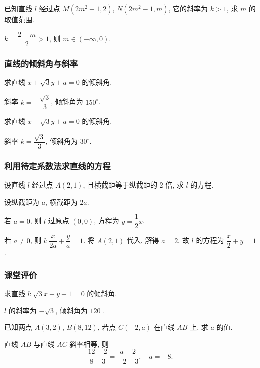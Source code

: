 \lianxi
\begin{exercise}[s]
    已知直线 $l$ 经过点 $M(2m^2 +1, 2)$, $N(2m^2 -1, m)$, 它的斜率为 $k> 1$, 求 $m$ 的取值范围.
\end{exercise}
\beginsolution
    $k= \dfrac{2-m}2> 1$, 则 $m\in (-\infty,0)$.
\endsolution

\subsubsection{直线的倾斜角与斜率}
\begin{example}
    求直线 $x+\sqrt3 y+a=0$ 的倾斜角.
\end{example}
\beginsolution
    斜率 $k= -\dfrac{\sqrt3}3$, 倾斜角为 $150^\circ$.
\endsolution

\lianxi
\begin{exercise}[s]
    求直线 $x-\sqrt3 y+a=0$ 的倾斜角.
\end{exercise}
\beginsolution
    斜率 $k= \dfrac{\sqrt3}3$, 倾斜角为 $30^\circ$.
\endsolution

\subsubsection{利用待定系数法求直线的方程}
\begin{example}
    设直线 $l$ 经过点 $A(2,1)$, 且横截距等于纵截距的 $2$ 倍, 求 $l$ 的方程.
\end{example}
\beginsolution
    设纵截距为 $a$, 横截距为 $2a$.

    若 $a= 0$, 则 $l$ 过原点 $(0,0)$, 方程为 $y= \dfrac12x$.

    若 $a\neq 0$, 则 $l\colon \dfrac{x}{2a}+ \dfrac{y}a= 1$. 将 $A(2,1)$ 代入, 解得 $a=2$, 故 $l$ 的方程为 $\dfrac{x}2+ y= 1$.
\endsolution

\subsubsection{课堂评价}
\begin{exercise}
    求直线 $l\colon \sqrt3x+y+1=0$ 的倾斜角.
\end{exercise}
\beginsolution
    $l$ 的斜率为 $-\sqrt3$, 倾斜角为 $120^\circ$.
\endsolution

\begin{exercise}
    已知两点 $A(3, 2)$, $B(8, 12)$, 若点 $C(-2, a)$ 在直线 $AB$ 上, 求 $a$ 的值.
\end{exercise}
\beginsolution
    直线 $AB$ 与直线 $AC$ 斜率相等, 则
    \[\frac{12-2}{8-3}= \frac{a-2}{-2-3},\quad a=-8.\]
\endsolution

